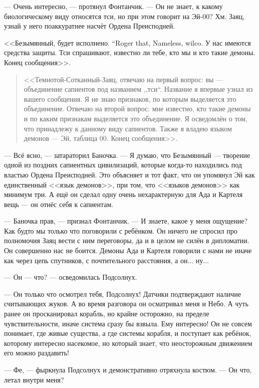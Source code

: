 --- Очень интересно, --- протянул Фонтанчик.
--- Он не знает, к какому биологическому виду относятся тси, но при этом говорит на Эй-00?
Хм.
Заяц, узнай у него поаккуратнее насчёт Ордена Преисподней.

{<<Безымянный, будет исполнено.}
{``Roger that, Nameless, wilco.}
У нас имеются средства защиты.
Тси спрашивают, известно ли тебе, кто мы и кто такие демоны.
Конец сообщения>>.

\begin{quote}
<<Темнотой-Сотканный-Заяц, отвечаю на первый вопрос: вы --- объединение сапиентов под названием ,,тси``.
Название я впервые узнал из вашего сообщения.
Я не знаю признаков, по которым выделяется это объединение.
Отвечаю на второй вопрос: мне известно, кто такие демоны и по каким признакам выделяется это объединение.
Я осведомлён о том, что принадлежу к данному виду сапиентов.
Также я владею языком демонов --- Эй, таблица 00.
Конец сообщения>>.
\end{quote}

--- Всё ясно, --- затараторил Баночка.
--- Я думаю, что Безымянный --- творение одной из поздних сапиентных цивилизаций, которые когда-то находились под властью Ордена Преисподней.
Это объясняет и тот факт, что он упомянул Эй как единственный <<язык демонов>>, при том, что <<языков демонов>> как минимум три.
А ещё он сделал одну очень нехарактерную для Ада и Картеля вещь --- он отнёс себя к сапиентам.

--- Баночка прав, --- признал Фонтанчик.
--- И знаете, какое у меня ощущение?
Как будто мы только что поговорили с ребёнком.
Он ничего не спросил про полномочия Заяц вести с ним переговоры, да и в целом не силён в дипломатии.
Он совершенно нас не боится.
Демоны Ада и Картеля говорили с нами не иначе как через цепь спутников, с почтительного расстояния, а он... ну...

--- Он --- что? --- осведомилась Подсолнух.

--- Он только что осмотрел тебя, Подсолнух!
Датчики подтверждают наличие считывающих жуков.
А во время разговора он осматривал меня и Небо.
А чуть ранее он просканировал корабль, но крайне осторожно, на пределе чувствительности, иначе система сразу бы взвыла.
Ему интересно!
Он не совсем понимает, где живые существа, а где системы корабля, и поступает как ребёнок, которому интересно насекомое, но который знает, что неосторожным движением его можно раздавить!

--- Фе, --- фыркнула Подсолнух и демонстративно отряхнула костюм.
--- Он что, летал внутри меня?

